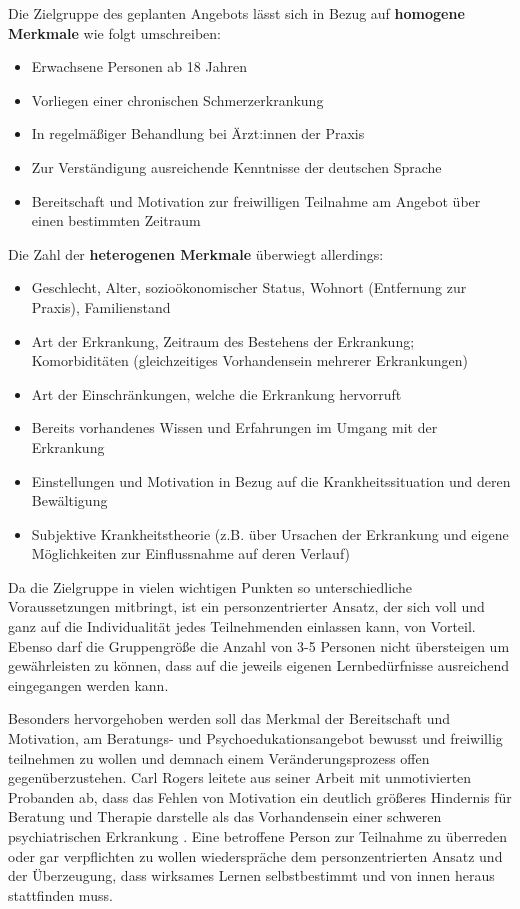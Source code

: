 \documentclass[
  twoside,
  parskip=half-,
  paper=176mm:246mm,
  BCOR=14mm,
  DIV=14,
]{scrreprt}
\begin{document}
\begin{praxis}
  Die Zielgruppe des geplanten Angebots lässt sich in Bezug auf \textbf{homogene Merkmale} wie folgt umschreiben: 
  \begin{itemize}[itemsep=0pt]
    \item Erwachsene Personen ab 18 Jahren
    \item Vorliegen einer chronischen Schmerzerkrankung
    \item In regelmäßiger Behandlung bei Ärzt:innen der Praxis
    \item Zur Verständigung ausreichende Kenntnisse der deutschen Sprache
    \item Bereitschaft und Motivation zur freiwilligen Teilnahme am Angebot über einen bestimmten Zeitraum
  \end{itemize}

Die Zahl der \textbf{heterogenen Merkmale} überwiegt allerdings:
\begin{itemize}[itemsep=0pt]
  \item Geschlecht, Alter, sozioökonomischer Status, Wohnort (Entfernung zur Praxis), Familienstand
  \item Art der Erkrankung, Zeitraum des Bestehens der Erkrankung; Komorbiditäten (gleichzeitiges Vorhandensein mehrerer Erkrankungen)
  \item Art der Einschränkungen, welche die Erkrankung hervorruft
  \item Bereits vorhandenes Wissen und Erfahrungen im Umgang mit der Erkrankung
  \item Einstellungen und Motivation in Bezug auf die Krankheitssituation und deren Bewältigung
  \item Subjektive Krankheitstheorie (z.B. über Ursachen der Erkrankung und eigene Möglichkeiten zur Einflussnahme auf deren Verlauf)
\end{itemize}

Da die Zielgruppe in vielen wichtigen Punkten so unterschiedliche Voraussetzungen mitbringt, ist ein personzentrierter Ansatz, der sich voll und ganz auf die Individualität jedes Teilnehmenden einlassen kann, von Vorteil. Ebenso darf die Gruppengröße die Anzahl von 3-5 Personen nicht übersteigen um gewährleisten zu können, dass auf die jeweils eigenen Lernbedürfnisse ausreichend eingegangen werden kann.

Besonders hervorgehoben werden soll das Merkmal der Bereitschaft und Motivation, am Beratungs- und Psychoedukationsangebot bewusst und freiwillig teilnehmen zu wollen und demnach einem Veränderungsprozess offen gegenüberzustehen. Carl Rogers leitete aus seiner Arbeit mit unmotivierten Probanden ab, dass das Fehlen von Motivation ein deutlich größeres Hindernis für Beratung und Therapie darstelle als das Vorhandensein einer schweren psychiatrischen Erkrankung \autocite[vgl.][195f.]{rogers1977}. Eine betroffene Person zur Teilnahme zu überreden oder gar verpflichten zu wollen wiederspräche dem personzentrierten Ansatz und der Überzeugung, dass wirksames Lernen selbstbestimmt und von innen heraus stattfinden muss. 
\end{praxis}
\end{document}
